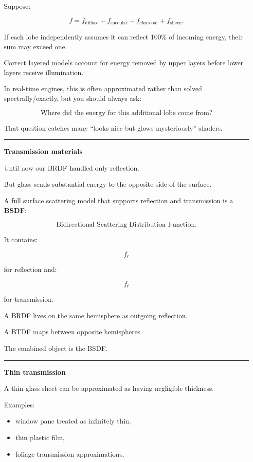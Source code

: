 Suppose:

\[
f=
f_{\text{diffuse}}
+
f_{\text{specular}}
+
f_{\text{clearcoat}}
+
f_{\text{sheen}}.
\]

If each lobe independently assumes it can reflect 100\% of incoming energy, their sum may exceed one.

Correct layered models account for energy removed by upper layers before lower layers receive illumination.

In real-time engines, this is often approximated rather than solved spectrally/exactly, but you should always ask:

\[
\boxed{
\text{Where did the energy for this additional lobe come from?}
}
\]

That question catches many ``looks nice but glows mysteriously'' shaders.

\begin{center}\rule{0.5\linewidth}{0.5pt}\end{center}

\textbf{Transmission materials}

Until now our BRDF handled only reflection.

But glass sends substantial energy to the opposite side of the surface.

A full surface scattering model that supports reflection and transmission is a \textbf{BSDF}:

\[
\text{Bidirectional Scattering Distribution Function}.
\]

It contains:

\[
f_r
\]

for reflection and:

\[
f_t
\]

for transmission.

A BRDF lives on the same hemisphere as outgoing reflection.

A BTDF maps between opposite hemispheres.

The combined object is the BSDF.

\begin{center}\rule{0.5\linewidth}{0.5pt}\end{center}

\textbf{Thin transmission}

A thin glass sheet can be approximated as having negligible thickness.

Examples:

\begin{itemize}
\tightlist
\item
  window pane treated as infinitely thin,
\item
  thin plastic film,
\item
  foliage transmission approximations.
\end{itemize}

